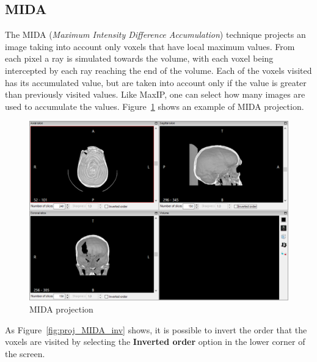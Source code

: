 \subsection{MIDA}
\label{sub:mida}
The MIDA (\textit{Maximum Intensity Difference Accumulation}) technique projects an image taking into account only voxels that have local maximum values. From each pixel a ray is simulated towards the volume, with each voxel being intercepted by each ray reaching the end of the volume. Each of the voxels visited has its accumulated value, but are taken into account only if the value is greater than previously visited values. Like MaxIP, one can select how many images are used to accumulate the values. Figure~\ref{fig:proj_MIDA} shows an example of MIDA projection.

\begin{figure}[!h]
\centering
\includegraphics[scale=0.40]{../user_guide_figures/invesalius_screen/multiplanar_window_mida_en.png}
\caption{MIDA projection}
\label{fig:proj_MIDA}
\end{figure}

As Figure~\ref{fig:proj_MIDA_inv} shows, it is possible to invert the order that the voxels are visited by selecting the \textbf{Inverted order} option in the lower corner of the screen.

